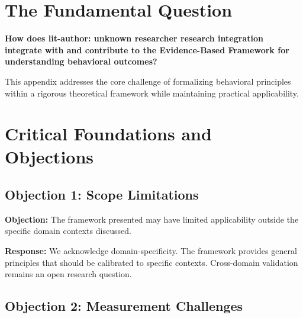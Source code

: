 \section{The Fundamental Question}
\label{sec:ctm-fundamental}

\begin{tcolorbox}[
    colback=red!5!white,
    colframe=red!75!black,
    title={\textbf{Fundamental Question}}
]
\textbf{How does lit-author: unknown researcher research integration integrate with and contribute to the
Evidence-Based Framework for understanding behavioral outcomes?}

This appendix addresses the core challenge of formalizing behavioral principles
within a rigorous theoretical framework while maintaining practical applicability.
\end{tcolorbox}





\section{Critical Foundations and Objections}
\label{sec:ctm-foundations}

\subsection{Objection 1: Scope Limitations}

\textbf{Objection:} The framework presented may have limited applicability
outside the specific domain contexts discussed.

\textbf{Response:} We acknowledge domain-specificity. The framework provides
general principles that should be calibrated to specific contexts. Cross-domain
validation remains an open research question.

\subsection{Objection 2: Measurement Challenges}

